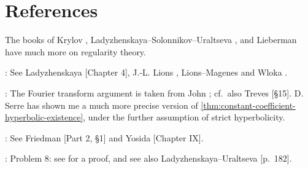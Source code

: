 
\section{References}
\label{sec:chapter7-references}

The books of Krylov \cite{Krylov1996}, Ladyzhenskaya--Solonnikov--Uraltseva \cite{LadyzhenskayaSolonnikovUraltseva1968}, and Lieberman \cite{Lieberman1996} have much more on regularity theory.

: See Ladyzhenskaya \cite{Ladyzhenskaya1985}[Chapter 4], J.-L. Lions \cite{Lions1961}, Lions--Magenes \cite{LionsMagenes1972} and Wloka \cite{Wloka1987}.

: The Fourier transform argument is taken from John \cite{John1982}; cf.\ also Treves \cite{Treves1975}[\S15]. D. Serre has shown me a much more precise version of \cref{thm:constant-coefficient-hyperbolic-existence}, under the further assumption of strict hyperbolicity.

: See Friedman \cite{Friedman1969}[Part 2, \S1] and Yosida \cite{Yosida1980}[Chapter IX].

: Problem 8: see \cite{BrezisEvans1979} for a proof, and see also Ladyzhenskaya--Uraltseva \cite{LadyzhenskayaUraltseva1968}[p.\ 182].
